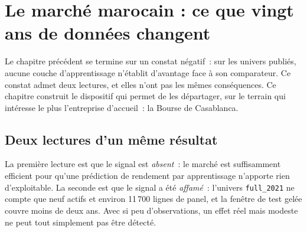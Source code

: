 %
%

\chapter{Le marché marocain : ce que vingt ans de données changent}
\label{chap:maroc}

Le chapitre précédent se termine sur un constat négatif~: sur les univers
publiés, aucune couche d'apprentissage n'établit d'avantage face à son
comparateur. Ce constat admet deux lectures, et elles n'ont pas les mêmes
conséquences. Ce chapitre construit le dispositif qui permet de les départager,
sur le terrain qui intéresse le plus l'entreprise d'accueil~: la Bourse de
Casablanca.

\section{Deux lectures d'un même résultat}

La première lecture est que le signal est \emph{absent}~: le marché est
suffisamment efficient pour qu'une prédiction de rendement par apprentissage
n'apporte rien d'exploitable. La seconde est que le signal a été
\emph{affamé}~: l'univers \texttt{full\_2021} ne compte que neuf actifs et
environ 11\,700 lignes de panel, et la fenêtre de test gelée couvre moins de
deux ans. Avec si peu d'observations, un effet réel mais modeste ne peut tout
simplement pas être détecté.

